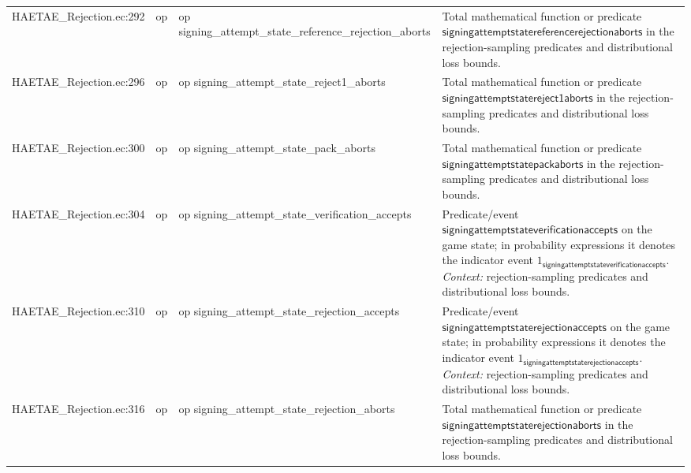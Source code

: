 \documentclass[10pt]{article}
\begin{document}
\begin{longtable}{L{0.11\textwidth}L{0.055\textwidth}L{0.385\textwidth}L{0.41\textwidth}}
HAETAE\_\allowbreak{}Rejection.\allowbreak{}ec:\allowbreak{}292 & op & {\ttfamily\scriptsize op signing\_\allowbreak{}attempt\_\allowbreak{}state\_\allowbreak{}reference\_\allowbreak{}rejection\_\allowbreak{}aborts} & Total mathematical function or predicate $\mathsf{signingattemptstatereferencerejectionaborts}$ in the rejection-sampling predicates and distributional loss bounds. \\
HAETAE\_\allowbreak{}Rejection.\allowbreak{}ec:\allowbreak{}296 & op & {\ttfamily\scriptsize op signing\_\allowbreak{}attempt\_\allowbreak{}state\_\allowbreak{}reject1\_\allowbreak{}aborts} & Total mathematical function or predicate $\mathsf{signingattemptstatereject1aborts}$ in the rejection-sampling predicates and distributional loss bounds. \\
HAETAE\_\allowbreak{}Rejection.\allowbreak{}ec:\allowbreak{}300 & op & {\ttfamily\scriptsize op signing\_\allowbreak{}attempt\_\allowbreak{}state\_\allowbreak{}pack\_\allowbreak{}aborts} & Total mathematical function or predicate $\mathsf{signingattemptstatepackaborts}$ in the rejection-sampling predicates and distributional loss bounds. \\
HAETAE\_\allowbreak{}Rejection.\allowbreak{}ec:\allowbreak{}304 & op & {\ttfamily\scriptsize op signing\_\allowbreak{}attempt\_\allowbreak{}state\_\allowbreak{}verification\_\allowbreak{}accepts} & Predicate/event $\mathsf{signingattemptstateverificationaccepts}$ on the game state; in probability expressions it denotes the indicator event $1_{\mathsf{signingattemptstateverificationaccepts}}$. \emph{Context:} rejection-sampling predicates and distributional loss bounds. \\
HAETAE\_\allowbreak{}Rejection.\allowbreak{}ec:\allowbreak{}310 & op & {\ttfamily\scriptsize op signing\_\allowbreak{}attempt\_\allowbreak{}state\_\allowbreak{}rejection\_\allowbreak{}accepts} & Predicate/event $\mathsf{signingattemptstaterejectionaccepts}$ on the game state; in probability expressions it denotes the indicator event $1_{\mathsf{signingattemptstaterejectionaccepts}}$. \emph{Context:} rejection-sampling predicates and distributional loss bounds. \\
HAETAE\_\allowbreak{}Rejection.\allowbreak{}ec:\allowbreak{}316 & op & {\ttfamily\scriptsize op signing\_\allowbreak{}attempt\_\allowbreak{}state\_\allowbreak{}rejection\_\allowbreak{}aborts} & Total mathematical function or predicate $\mathsf{signingattemptstaterejectionaborts}$ in the rejection-sampling predicates and distributional loss bounds. \\

\end{longtable}
\end{document}
